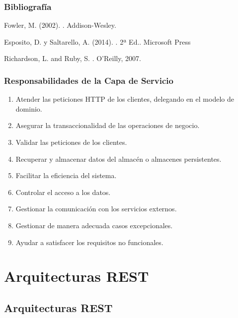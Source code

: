 \documentclass[a4paper,slidestop,xcolor=pst,blue]{beamer}
\begin{document}
\begin{frame}[c]
    \frametitle{Bibliografía}
    \begin{thebibliography}{1}

        Fowler, M. (2002).
        .
        \newblock Addison-Wesley.

        Esposito, D. y Saltarello, A. (2014).
        . 2ª Ed..
        \newblock Microsoft Press

        Richardson, L. and Ruby, S.
        .
        \newblock  O'Reilly, 2007.

    \end{thebibliography}
\end{frame}

\begin{frame}[c]
	\frametitle{Responsabilidades de la Capa de Servicio}
	\begin{enumerate}[<+->]
        \item Atender las peticiones HTTP de los clientes, delegando en el modelo de dominio.
        \item Asegurar la transaccionalidad de las operaciones de negocio.
        \item Validar las peticiones de los clientes.
        \item Recuperar y almacenar datos del almacén o almacenes persistentes.
        \item Facilitar la eficiencia del sistema.
        \item Controlar el acceso a los datos.
        \item Gestionar la comunicación con los servicios externos.
        \item Gestionar de manera adecuada casos excepcionales.
        \item Ayudar a satisfacer los requisitos no funcionales.
	\end{enumerate}
\end{frame}

\section{Arquitecturas REST}

\subsection{Arquitecturas REST}
\end{document}
